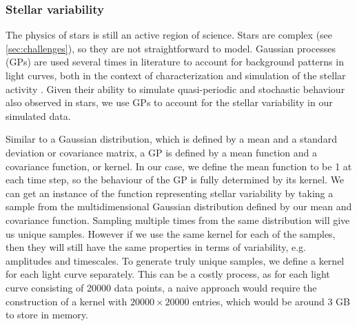 \subsubsection{Stellar variability}


The physics of stars is still an active region of science. Stars are complex (see \ref{sec:challenges}), so they are not straightforward to model. Gaussian processes (GPs) are used several times in literature to account for background patterns in light curves, both in the context of characterization and simulation of the stellar activity \citep{barros2020improving, zucker2018shallow}. Given their ability to simulate quasi-periodic and stochastic behaviour also observed in stars, we use GPs to account for the stellar variability in our simulated data.

Similar to a Gaussian distribution, which is defined by a mean and a standard deviation or covariance matrix, a GP is defined by a mean function and a covariance function, or kernel. In our case, we define the mean function to be 1 at each time step, so the behaviour of the GP is fully determined by its kernel. We can get an instance of the function representing stellar variability by taking a sample from the multidimensional Gaussian distribution defined by our mean and covariance function. Sampling multiple times from the same distribution will give us unique samples. However if we use the same kernel for each of the samples, then they will still have the same properties in terms of variability, e.g. amplitudes and timescales. To generate truly unique samples, we define a kernel for each light curve separately. This can be a costly process, as for each light curve consisting of 20000 data points, a naive approach would require the construction of a kernel with $20000 \times 20000$ entries, which would be around 3 GB to store in memory. 

